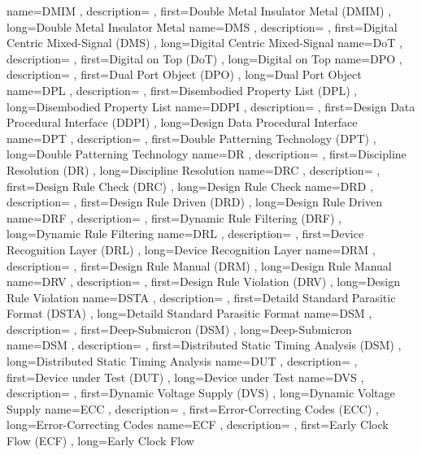 { name={DMIM}
, description={}
, first={Double Metal Insulator Metal (DMIM)}
, long={Double Metal Insulator Metal}
}
{ name={DMS}
, description={}
, first={Digital Centric Mixed-Signal (DMS)}
, long={Digital Centric Mixed-Signal}
}
{ name={DoT}
, description={}
, first={Digital on Top (DoT)}
, long={Digital on Top}
}
{ name={DPO}
, description={}
, first={Dual Port Object (DPO)}
, long={Dual Port Object}
}
{ name={DPL}
, description={}
, first={Disembodied Property List (DPL)}
, long={Disembodied Property List}
}
{ name={DDPI}
, description={}
, first={Design Data Procedural Interface (DDPI)}
, long={Design Data Procedural Interface}
}
{ name={DPT}
, description={}
, first={Double Patterning Technology (DPT)}
, long={Double Patterning Technology}
}
{ name={DR}
, description={}
, first={Discipline Resolution (DR)}
, long={Discipline Resolution}
}
{ name={DRC}
, description={}
, first={Design Rule Check (DRC)}
, long={Design Rule Check}
}
{ name={DRD}
, description={}
, first={Design Rule Driven (DRD)}
, long={Design Rule Driven}
}
{ name={DRF}
, description={}
, first={Dynamic Rule Filtering (DRF)}
, long={Dynamic Rule Filtering}
}
{ name={DRL}
, description={}
, first={Device Recognition Layer (DRL)}
, long={Device Recognition Layer}
}
{ name={DRM}
, description={}
, first={Design Rule Manual (DRM)}
, long={Design Rule Manual}
}
{ name={DRV}
, description={}
, first={Design Rule Violation (DRV)}
, long={Design Rule Violation}
}
{ name={DSTA}
, description={}
, first={Detaild Standard Parasitic Format (DSTA)}
, long={Detaild Standard Parasitic Format}
}
{ name={DSM}
, description={}
, first={Deep-Submicron (DSM)}
, long={Deep-Submicron}
}
{ name={DSM}
, description={}
, first={Distributed Static Timing Analysis (DSM)}
, long={Distributed Static Timing Analysis}
}
{ name={DUT}
, description={}
, first={Device under Test (DUT)}
, long={Device under Test}
}
{ name={DVS}
, description={}
, first={Dynamic Voltage Supply (DVS)}
, long={Dynamic Voltage Supply}
}
{ name={ECC}
, description={}
, first={Error-Correcting Codes (ECC)}
, long={Error-Correcting Codes}
}
{ name={ECF}
, description={}
, first={Early Clock Flow (ECF)}
, long={Early Clock Flow}
}
